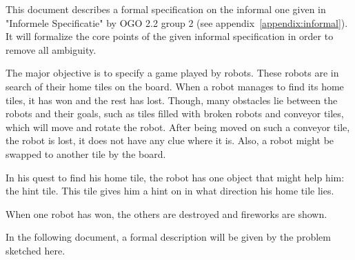 This document describes a formal specification on the informal one given in "Informele Specificatie" by OGO 2.2 group 2 (see appendix~\ref{appendix:informal}).
It will formalize the core points of the given informal specification in order to remove all ambiguity.

The major objective is to specify a game played by robots. These robots are in search of their home tiles on the board. When a robot manages to find its home tiles, it has won and the rest has lost. Though, many obstacles lie between the robots and their goals, such as tiles filled with broken robots and conveyor tiles, which will move and rotate the robot. After being moved on such a conveyor tile, the robot is lost, it does not have any clue where it is. Also, a robot might be swapped to another tile by the board. 

In his quest to find his home tile, the robot has one object that might help him: the hint tile. This tile gives him a hint on in what direction his home tile lies. 

When one robot has won, the others are destroyed and fireworks are shown.

In the following document, a formal description will be given by the problem sketched here.
